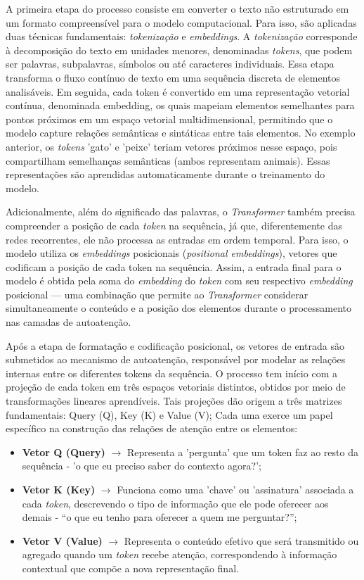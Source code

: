 A primeira etapa do processo consiste em converter o texto não estruturado em um formato compreensível para o modelo computacional. Para isso, são aplicadas duas técnicas fundamentais: \textit{tokenização} e \textit{embeddings}. A \textit{tokenização} corresponde à decomposição do texto em unidades menores, denominadas \textit{tokens}, que podem ser palavras, subpalavras, símbolos ou até caracteres individuais. Essa etapa transforma o fluxo contínuo de texto em uma sequência discreta de elementos analisáveis. Em seguida, cada token é convertido em uma representação vetorial contínua, denominada embedding, os quais mapeiam elementos semelhantes para pontos próximos em um espaço vetorial multidimensional, permitindo que o modelo capture relações semânticas e sintáticas entre tais elementos. No exemplo anterior, os \textit{tokens} 'gato' e 'peixe' teriam vetores próximos nesse espaço, pois compartilham semelhanças semânticas (ambos representam animais). Essas representações são aprendidas automaticamente durante o treinamento do modelo.

Adicionalmente, além do significado das palavras, o \textit{Transformer} também precisa compreender a posição de cada \textit{token} na sequência, já que, diferentemente das redes recorrentes, ele não processa as entradas em ordem temporal. Para isso, o modelo utiliza os \textit{embeddings} posicionais (\textit{positional embeddings}), vetores que codificam a posição de cada token na sequência. Assim, a entrada final para o modelo é obtida pela soma do \textit{embedding} do \textit{token} com seu respectivo \textit{embedding} posicional — uma combinação que permite ao \textit{Transformer} considerar simultaneamente o conteúdo e a posição dos elementos durante o processamento nas camadas de autoatenção.

Após a etapa de formatação e codificação posicional, os vetores de entrada são submetidos ao mecanismo de autoatenção, responsável por modelar as relações internas entre os diferentes tokens da sequência. O processo tem início com a projeção de cada token em três espaços vetoriais distintos, obtidos por meio de transformações lineares aprendíveis. Tais projeções dão origem a três matrizes fundamentais: Query (Q), Key (K) e Value (V); Cada uma exerce um papel específico na construção das relações de atenção entre os elementos:

\begin{itemize}
    \item \textbf{Vetor Q (Query)} 	$\rightarrow$ Representa a 'pergunta' que um token faz ao resto da sequência - 'o que eu preciso saber do contexto agora?';
    \item \textbf{Vetor K (Key)} 	$\rightarrow$ Funciona como uma 'chave' ou 'assinatura' associada a cada \textit{token}, descrevendo o tipo de informação que ele pode oferecer aos demais - “o que eu tenho para oferecer a quem me perguntar?”;
    \item \textbf{Vetor V (Value)} $\rightarrow$ Representa o conteúdo efetivo que será transmitido ou agregado quando um \textit{token} recebe atenção, correspondendo à informação contextual que compõe a nova representação final.
\end{itemize}

